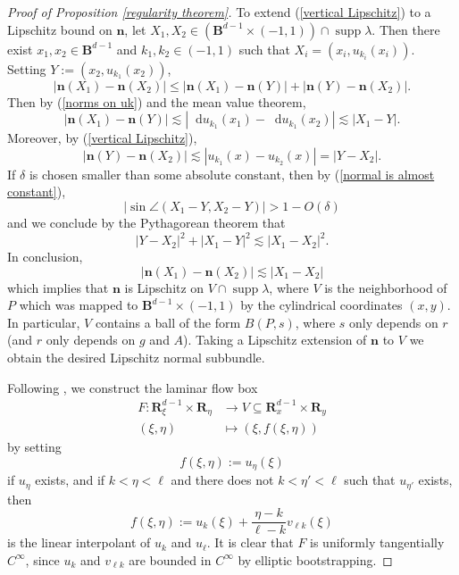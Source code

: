 \documentclass[final,12pt, leqno]{brownthesis}
\newcommand{\RR}{\mathbf{R}}
\newcommand{\Ball}{\mathbf{B}}
\DeclareMathOperator{\Lip}{Lip}
\DeclareMathOperator{\supp}{supp}
\newcommand*\dif{\mathop{}\!\mathrm{d}}
\DeclareMathOperator{\dist}{dist}
\newcommand{\normal}{\mathbf n}
\theoremstyle{definition}
\numberwithin{equation}{section}
\begin{document}
\begin{proof}[Proof of Proposition \ref{regularity theorem}]
To extend (\ref{vertical Lipschitz}) to a Lipschitz bound on $\normal$, let $X_1, X_2 \in (\Ball^{d - 1} \times (-1, 1)) \cap \supp \lambda$.
Then there exist $x_1, x_2 \in \Ball^{d - 1}$ and $k_1, k_2 \in (-1, 1)$ such that $X_i = (x_i, u_{k_i}(x_i))$.
Setting $Y := (x_2, u_{k_1}(x_2))$,
$$|\normal(X_1) - \normal(X_2)| \leq |\normal(X_1) - \normal(Y)| + |\normal(Y) - \normal(X_2)|.$$
Then by (\ref{norms on uk}) and the mean value theorem,
$$|\normal(X_1) - \normal(Y)| \lesssim |\dif u_{k_1}(x_1) - \dif u_{k_1}(x_2)| \lesssim |X_1 - Y|.$$
Moreover, by (\ref{vertical Lipschitz}),
$$|\normal(Y) - \normal(X_2)| \lesssim |u_{k_1}(x) - u_{k_2}(x)| = |Y - X_2|.$$
If $\delta$ is chosen smaller than some absolute constant, then by (\ref{normal is almost constant}),
$$|\sin \angle(X_1 - Y, X_2 - Y)| > 1 - O(\delta)$$
and we conclude by the Pythagorean theorem that
$$|Y - X_2|^2 + |X_1 - Y|^2 \lesssim |X_1 - X_2|^2.$$
In conclusion,
$$|\normal(X_1) - \normal(X_2)| \lesssim |X_1 - X_2|$$
which implies that $\normal$ is Lipschitz on $V \cap \supp \lambda$, where $V$ is the neighborhood of $P$ which was mapped to $\Ball^{d - 1} \times (-1, 1)$ by the cylindrical coordinates $(x, y)$.
In particular, $V$ contains a ball of the form $B(P, s)$, where $s$ only depends on $r$ (and $r$ only depends on $g$ and $A$).
Taking a Lipschitz extension of $\normal$ to $V$ we obtain the desired Lipschitz normal subbundle.

Following \cite[Appendix B]{ColdingMinicozziIV}, we construct the laminar flow box
\begin{align*}
	F: \RR^{d - 1}_\xi \times \RR_\eta &\to V \subseteq \RR^{d - 1}_x \times \RR_y \\
	(\xi, \eta) &\mapsto (\xi, f(\xi, \eta))
\end{align*}
by setting
$$f(\xi, \eta) := u_\eta(\xi)$$
if $u_\eta$ exists, and if $k < \eta < \ell$ and there does not $k < \eta' < \ell$ such that $u_{\eta'}$ exists, then
$$f(\xi, \eta) := u_k(\xi) + \frac{\eta - k}{\ell - k} v_{\ell k}(\xi)$$
is the linear interpolant of $u_k$ and $u_\ell$.
It is clear that $F$ is uniformly tangentially $C^\infty$, since $u_k$ and $v_{\ell k}$ are bounded in $C^\infty$ by elliptic bootstrapping.


\end{proof}
\end{document}
